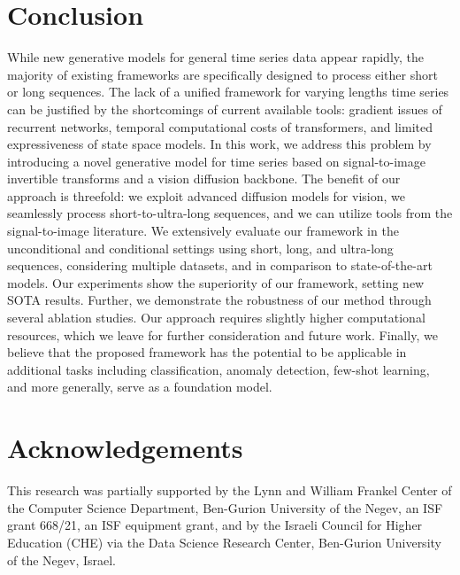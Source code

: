 \documentclass{article}
\begin{document}
\section{Conclusion}
 
While new generative models for general time series data appear rapidly, the majority of existing frameworks are specifically designed to process either short or long sequences. The lack of a unified framework for varying lengths time series can be justified by the shortcomings of current available tools: gradient issues of recurrent networks, temporal computational costs of transformers, and limited expressiveness of state space models. In this work, we address this problem by introducing a novel generative model for time series based on signal-to-image invertible transforms and a vision diffusion backbone. The benefit of our approach is threefold: we exploit advanced diffusion models for vision, we seamlessly process short-to-ultra-long sequences, and we can utilize tools from the signal-to-image literature. We extensively evaluate our framework in the unconditional and conditional settings using short, long, and ultra-long sequences, considering multiple datasets, and in comparison to state-of-the-art models. Our experiments show the superiority of our framework, setting new SOTA results. Further, we demonstrate the robustness of our method through several ablation studies. Our approach requires slightly higher computational resources, which we leave for further consideration and future work. Finally, we believe that the proposed framework has the potential to be applicable in additional tasks including classification, anomaly detection, few-shot learning, and more generally, serve as a foundation model.

\clearpage

\section*{Acknowledgements}
This research was partially supported by the Lynn and
William Frankel Center of the Computer Science Department, Ben-Gurion University of the Negev, an ISF grant
668/21, an ISF equipment grant, and by the Israeli Council
for Higher Education (CHE) via the Data Science Research
Center, Ben-Gurion University of the Negev, Israel.



{
\small



}

\clearpage
\appendix
\end{document}

